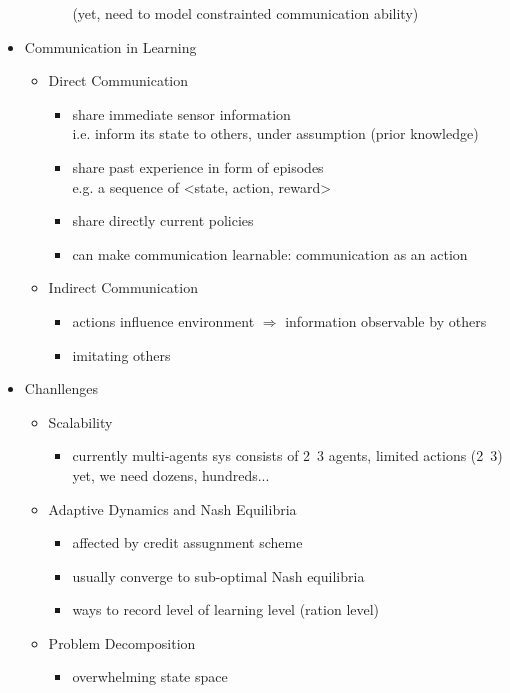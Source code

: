 \begin{itemize}
\begin{itemize}
\begin{itemize}
		(yet, need to model constrainted communication ability)
		\end{itemize}
	\end{itemize}
\item Communication in Learning
	\begin{itemize}
	\item Direct Communication
		\begin{itemize}
		\item share immediate sensor information \\
		i.e. inform its state to others, under assumption (prior knowledge)
		\item share past experience in form of episodes \\
		e.g. a sequence of <state, action, reward>
		\item share directly current policies
		\item can make communication learnable: communication as an action
		\end{itemize}
	\item Indirect Communication
		\begin{itemize}
		\item actions influence environment $\Rightarrow$ information observable by others
		\item imitating others 
		\end{itemize}
	\end{itemize}
\item Chanllenges
	\begin{itemize}
	\item Scalability
		\begin{itemize}
		\item currently multi-agents sys consists of 2~3 agents, limited actions (2~3) \\
		yet, we need dozens, hundreds...
		\end{itemize}
	\item Adaptive Dynamics and Nash Equilibria
		\begin{itemize}
		\item affected by credit assugnment scheme 
		\item usually converge to sub-optimal Nash equilibria
		\item ways to record level of learning level (ration level)
		\end{itemize}
	\item Problem Decomposition
		\begin{itemize}
		\item overwhelming state space

\end{itemize}
\end{itemize}
\end{itemize}
